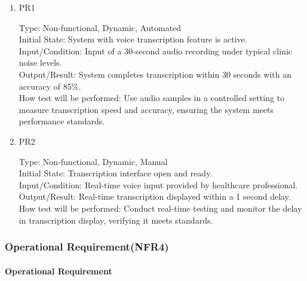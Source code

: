 \documentclass[12pt, titlepage]{article}
\begin{document}
\begin{enumerate}
    \item{PR1\\}
    
    Type: Non-functional, Dynamic, Automated\\
    
    Initial State: System with voice transcription feature is active.\\
    
    Input/Condition: Input of a 30-second audio recording under typical clinic noise levels.\\
    
    Output/Result: System completes transcription within 30 seconds with an accuracy of 85\%.\\
    
    How test will be performed: Use audio samples in a controlled setting to measure transcription speed and accuracy, ensuring the system meets performance standards.

    \item{PR2\\}
    
    Type: Non-functional, Dynamic, Manual\\
    
    Initial State: Transcription interface open and ready.\\
    
    Input/Condition: Real-time voice input provided by healthcare professional.\\
    
    Output/Result: Real-time transcription displayed within a 1 second delay.\\
    
    How test will be performed: Conduct real-time testing and monitor the delay in transcription display, verifying it meets standards.
\end{enumerate}

\subsubsection{Operational Requirement(NFR4)}

\paragraph{Operational Requirement}
\end{document}
